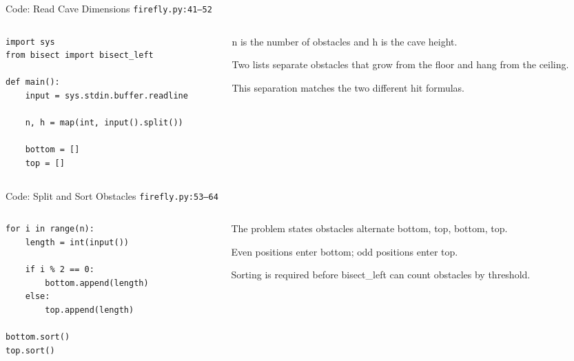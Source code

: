 \documentclass[aspectratio=169,11pt]{beamer}
\begin{document}
\begin{frame}[fragile]{Code: Read Cave Dimensions}
\scriptsize
{} \texttt{firefly.py:41--52}

\vspace{0.08cm}
\begin{columns}[T,totalwidth=\textwidth]
\begin{column}{0.58\textwidth}
\begin{lstlisting}[style=cpcode]
import sys
from bisect import bisect_left

def main():
    input = sys.stdin.buffer.readline

    n, h = map(int, input().split())

    bottom = []
    top = []
\end{lstlisting}
\end{column}
\begin{column}{0.38\textwidth}
\begin{tightitemize}
  \item n is the number of obstacles and h is the cave height.
  \item Two lists separate obstacles that grow from the floor and hang from the ceiling.
  \item This separation matches the two different hit formulas.
\end{tightitemize}
\end{column}
\end{columns}
\end{frame}

\begin{frame}[fragile]{Code: Split and Sort Obstacles}
\scriptsize
{} \texttt{firefly.py:53--64}

\vspace{0.08cm}
\begin{columns}[T,totalwidth=\textwidth]
\begin{column}{0.58\textwidth}
\begin{lstlisting}[style=cpcode]
for i in range(n):
    length = int(input())

    if i % 2 == 0:
        bottom.append(length)
    else:
        top.append(length)

bottom.sort()
top.sort()
\end{lstlisting}
\end{column}
\begin{column}{0.38\textwidth}
\begin{tightitemize}
  \item The problem states obstacles alternate bottom, top, bottom, top.
  \item Even positions enter bottom; odd positions enter top.
  \item Sorting is required before bisect\_left can count obstacles by threshold.
\end{tightitemize}
\end{column}
\end{columns}
\end{frame}
\end{document}
